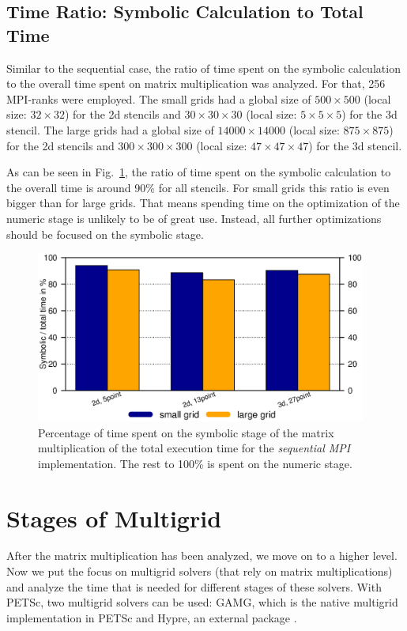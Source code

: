 \subsection{Time Ratio: Symbolic Calculation to Total Time}
Similar to the sequential case, the ratio of time spent on the symbolic calculation to the overall time spent on matrix multiplication was analyzed. For that, 256 MPI-ranks were employed. The small grids had a global size of $500\times 500$ (local size: $32\times 32$) for the 2d stencils and $30\times 30 \times 30$ (local size: $5\times 5 \times 5$) for the 3d stencil. The large grids had a global size of $14000\times 14000$ (local size: $875 \times 875$) for the 2d stencils and $300 \times 300 \times 300$ (local size: $47\times 47 \times 47$) for the 3d stencil. 

As can be seen in Fig.~\ref{fig:mpi_symnum}, the ratio of time spent on the symbolic calculation to the overall time is around 90\% for all stencils. For small grids this ratio is even bigger than for large grids. That means spending time on the optimization of the numeric stage is unlikely to be of great use. Instead, all further optimizations should be focused on the symbolic stage. 

\begin{figure}[tbp]
	\centering
	\includegraphics[width=0.97\textwidth, trim={0 3.cm 0 7cm},clip]{mpi_symnum}
	\caption{Percentage of time spent on the symbolic stage of the matrix multiplication of the total execution time for the \textit{sequential MPI} implementation. The rest to 100\% is spent on the numeric stage.} 
	\label{fig:mpi_symnum}
\end{figure}

\section{Stages of Multigrid}
After the matrix multiplication has been analyzed, we move on to a higher level. Now we put the focus on multigrid solvers (that rely on matrix multiplications) and analyze the time that is needed for different stages of these solvers. With PETSc, two multigrid solvers can be used: GAMG, which is the native multigrid implementation in PETSc and Hypre, an external package \cite{hypre-web-page}. 

